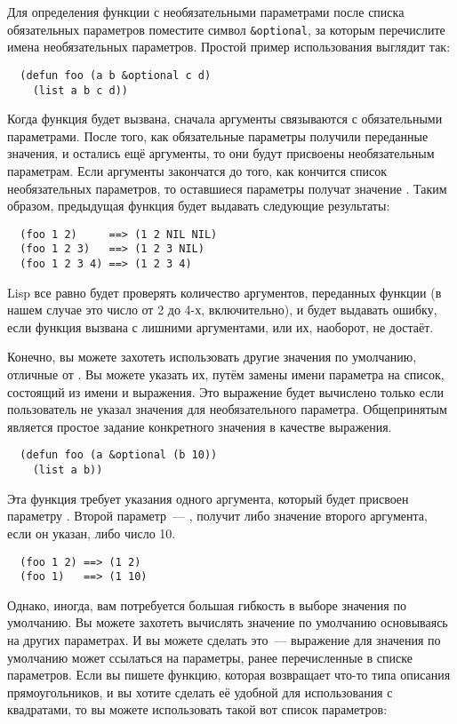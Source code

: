Для определения функции с необязательными параметрами после списка обязательных параметров
поместите символ \lstinline!&optional!, за которым перечислите имена необязательных
параметров.  Простой пример использования выглядит так:

\begin{lstlisting}
  (defun foo (a b &optional c d) 
    (list a b c d))
\end{lstlisting}

Когда функция будет вызвана, сначала аргументы связываются с обязательными параметрами.
После того, как обязательные параметры получили переданные значения, и остались ещё
аргументы, то они будут присвоены необязательным параметрам.  Если аргументы закончатся до
того, как кончится список необязательных параметров, то оставшиеся параметры получат
значение .  Таким образом, предыдущая функция будет выдавать следующие
результаты:

\begin{verbatim}
  (foo 1 2)     ==> (1 2 NIL NIL)
  (foo 1 2 3)   ==> (1 2 3 NIL)
  (foo 1 2 3 4) ==> (1 2 3 4)
\end{verbatim}

Lisp все равно будет проверять количество аргументов, переданных функции (в нашем случае
это число от 2 до 4-х, включительно), и будет выдавать ошибку, если функция вызвана с
лишними аргументами, или их, наоборот, не достаёт.

Конечно, вы можете захотеть использовать другие значения по умолчанию, отличные от
.  Вы можете указать их, путём замены имени параметра на список, состоящий из
имени и выражения.  Это выражение будет вычислено только если пользователь не указал
значения для необязательного параметра.  Общепринятым является простое задание конкретного
значения в качестве выражения.

\begin{lstlisting}
  (defun foo (a &optional (b 10)) 
    (list a b))
\end{lstlisting}

Эта функция требует указания одного аргумента, который будет присвоен параметру .
Второй параметр~--- , получит либо значение второго аргумента, если он указан, либо
число 10.

\begin{verbatim}
  (foo 1 2) ==> (1 2)
  (foo 1)   ==> (1 10)
\end{verbatim}

Однако, иногда, вам потребуется большая гибкость в выборе значения по умолчанию.  Вы
можете захотеть вычислять значение по умолчанию основываясь на других параметрах.  И вы
можете сделать это~--- выражение для значения по умолчанию может ссылаться на параметры,
ранее перечисленные в списке параметров.  Если вы пишете функцию, которая возвращает
что-то типа описания прямоугольников, и вы хотите сделать её удобной для использования с
квадратами, то вы можете использовать такой вот список параметров:

